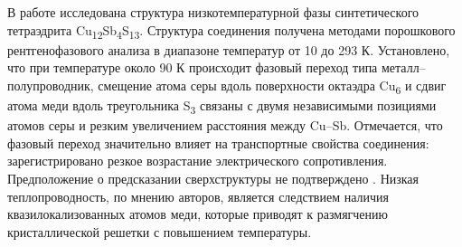 В работе \cite{Nasonova2016} исследована структура низкотемпературной фазы синтетического тетраэдрита Cu\textsubscript{12}Sb\textsubscript{4}S\textsubscript{13}. Структура соединения получена методами порошкового рентгенофазового анализа в диапазоне температур от 10 до 293 К. Установлено, что при температуре около 90 К происходит фазовый переход типа металл--полупроводник,  смещение атома серы вдоль поверхности октаэдра Cu\textsubscript{6} и сдвиг атома меди вдоль треугольника S\textsubscript{3} связаны с двумя независимыми позициями атомов серы и резким увеличением расстояния между Cu--Sb. Отмечается, что фазовый переход значительно влияет на транспортные свойства соединения: зарегистрировано резкое возрастание электрического сопротивления. Предположение о предсказании сверхструктуры не подтверждено \cite{Tanaka2015}.
Низкая теплопроводность, по мнению авторов, является следствием наличия квазилокализованных атомов меди, которые приводят к размягчению кристаллической решетки с повышением температуры.
